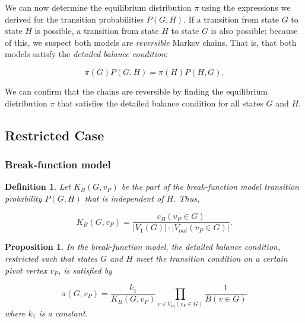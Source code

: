 \documentclass[a4paper,10pt]{article}
\newtheorem{defn}{Definition}
\newtheorem{prop}{Proposition}
\begin{document}
We can now determine the equilibrium distribution $\pi$ using the expressions we derived for the transition probabilities $P(G, H)$. If a transition from state $G$ to state $H$ is possible, a transition from state $H$ to state $G$ is also possible; because of this, we suspect both models are \emph{reversible} Markov chains. That is, that both models satisfy the \emph{detailed balance condition}:

\begin{equation}
 \pi(G) P(G, H) = \pi(H) P(H, G).
\end{equation}

We can confirm that the chains are reversible by finding the equilibrium distribution $\pi$ that satisfies the detailed balance condition for all states $G$ and $H$. 

\subsection{Restricted Case}

\subsubsection{Break-function model}
\begin{defn}
 Let $K_B(G, v_P)$ be the part of the break-function model transition probability $P(G, H)$ that is independent of $H$. Thus,

\begin{equation}
 K_B(G, v_P) = \frac{c_B(v_P \in G)}{|V_1(G)| \cdot |V_{out}(v_P \in G)|}.
\end{equation}
 
\end{defn}

\begin{prop}
 In the break-function model, the detailed balance condition, restricted such that states $G$ and $H$ meet the transition condition on a certain pivot vertex $v_P$, is satisfied by

 \begin{equation}
 \label{eqn:pi-k1-break}
  \pi(G, v_P) = \frac{k_1}{K_B(G, v_P)} 
 \prod \limits_{v \in V_{in}(v_P \in G)} \frac{1}{B(v \in G)}
 \end{equation}
where $k_1$ is a constant.
\end{prop}
\end{document}
